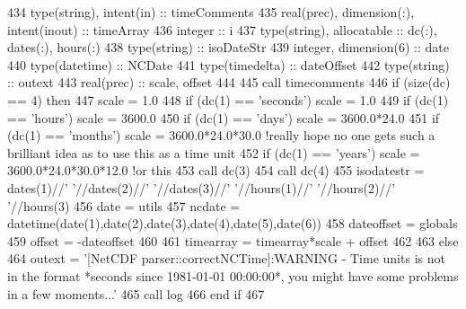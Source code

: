 \begin{DoxyCode}
434     \textcolor{keywordtype}{type}(string), \textcolor{keywordtype}{intent(in)} :: timeComments
435     \textcolor{keywordtype}{real(prec)}, \textcolor{keywordtype}{dimension(:)}, \textcolor{keywordtype}{intent(inout)} :: timeArray
436     \textcolor{keywordtype}{integer} :: i
437     \textcolor{keywordtype}{type}(string), \textcolor{keywordtype}{allocatable} :: dc(:), dates(:), hours(:)
438     \textcolor{keywordtype}{type}(string) :: isoDateStr
439     \textcolor{keywordtype}{integer}, \textcolor{keywordtype}{dimension(6)} :: date
440     \textcolor{keywordtype}{type}(datetime) :: NCDate
441     \textcolor{keywordtype}{type}(timedelta) :: dateOffset
442     \textcolor{keywordtype}{type}(string) :: outext
443     \textcolor{keywordtype}{real(prec)} :: scale, offset
444     
445     \textcolor{keyword}{call }timecomments%
446     \textcolor{keywordflow}{if} (\textcolor{keyword}{size}(dc) == 4) \textcolor{keywordflow}{then}
447         scale = 1.0
448         \textcolor{keywordflow}{if} (dc(1) == \textcolor{stringliteral}{'seconds'}) scale = 1.0
449         \textcolor{keywordflow}{if} (dc(1) == \textcolor{stringliteral}{'hours'})   scale = 3600.0
450         \textcolor{keywordflow}{if} (dc(1) == \textcolor{stringliteral}{'days'})    scale = 3600.0*24.0
451         \textcolor{keywordflow}{if} (dc(1) == \textcolor{stringliteral}{'months'})  scale = 3600.0*24.0*30.0 \textcolor{comment}{!really hope no one gets such a brilliant idea as
       to use this as a time unit}
452         \textcolor{keywordflow}{if} (dc(1) == \textcolor{stringliteral}{'years'})   scale = 3600.0*24.0*30.0*12.0 \textcolor{comment}{!or this}
453         \textcolor{keyword}{call }dc(3)%
454         \textcolor{keyword}{call }dc(4)%
455         isodatestr = dates(1)//\textcolor{stringliteral}{' '}//dates(2)//\textcolor{stringliteral}{' '}//dates(3)//\textcolor{stringliteral}{' '}//hours(1)//\textcolor{stringliteral}{' '}//hours(2)//\textcolor{stringliteral}{' '}//hours(3)
456         date = utils%
457         ncdate = datetime(date(1),date(2),date(3),date(4),date(5),date(6))
458         dateoffset = globals%
459         offset = -dateoffset%
460         
461         timearray = timearray*scale + offset
462         
463     \textcolor{keywordflow}{else}
464         outext = \textcolor{stringliteral}{'[NetCDF parser::correctNCTime]:WARNING - Time units is not in the format *seconds since
       1981-01-01 00:00:00*, you might have some problems in a few moments...'}
465         \textcolor{keyword}{call }log%
466 \textcolor{keywordflow}{    end if}  
467     
\end{DoxyCode}
